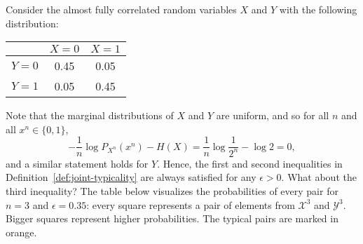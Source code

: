 \begin{example}\label{example:joint-typicality}
Consider the almost fully correlated random variables $X$ and $Y$ with the following distribution:
\begin{center}
\begin{tabular}{c || c | c |}
&$X=0$&$X=1$\\
\hline
\hline
$Y=0$&0.45&0.05\\
$Y=1$&0.05&0.45\\
\end{tabular}
\end{center}
Note that the marginal distributions of $X$ and $Y$ are uniform, and so for all $n$ and all $x^n \in \{0,1\}$,
\[-\frac{1}{n} \log P_{X^n}(x^n) - H(X) = \frac{1}{n} \log \frac{1}{2^n} - \log 2 = 0,\]
and a similar statement holds for $Y$. Hence, the first and second inequalities in Definition~\ref{def:joint-typicality} are always satisfied for any $\epsilon > 0$. What about the third inequality? The table below visualizes the probabilities of every pair for $n = 3$ and $\epsilon = 0.35$: every square represents a pair of elements from $\mathcal{X}^3$ and $\mathcal{Y}^3$. Bigger squares represent higher probabilities. The typical pairs are marked in orange.

\newcommand{\mysquare}[4]{%
	\def\size{#2}
	\def\x{#3}
	\def\y{#4}
	\fill[#1] (\x-\size*0.5, \y-\size*0.5) rectangle (\x+\size*0.5, \y+\size*0.5);
}


\begin{center}
\end{center}
\end{example}
